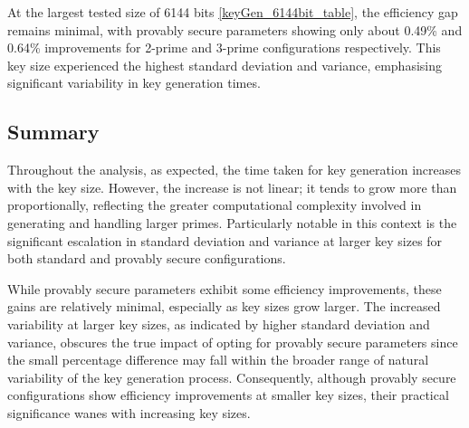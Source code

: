 \documentclass[]{final_report}
\theoremstyle{definition}
\begin{document}

 
At the largest tested size of 6144 bits \ref{keyGen_6144bit_table}, the efficiency gap remains minimal, with provably secure parameters showing only about 0.49\% and 0.64\% improvements for 2-prime and 3-prime configurations respectively. This key size experienced the highest standard deviation and variance, emphasising significant variability in key generation times.


\subsection*{Summary}
Throughout the analysis, as expected, the time taken for key generation increases with the key size. However, the increase is not linear; it tends to grow more than proportionally, reflecting the greater computational complexity involved in generating and handling larger primes. Particularly notable in this context is the significant escalation in standard deviation and variance at larger key sizes for both standard and provably secure configurations. 

While provably secure parameters exhibit some efficiency improvements, these gains are relatively minimal, especially as key sizes grow larger. The increased variability at larger key sizes, as indicated by higher standard deviation and variance, obscures the true impact of opting for provably secure parameters since the small percentage difference may fall within the broader range of natural variability of the key generation process. Consequently, although provably secure configurations show efficiency improvements at smaller key sizes, their practical significance wanes with increasing key sizes.
\end{document}
